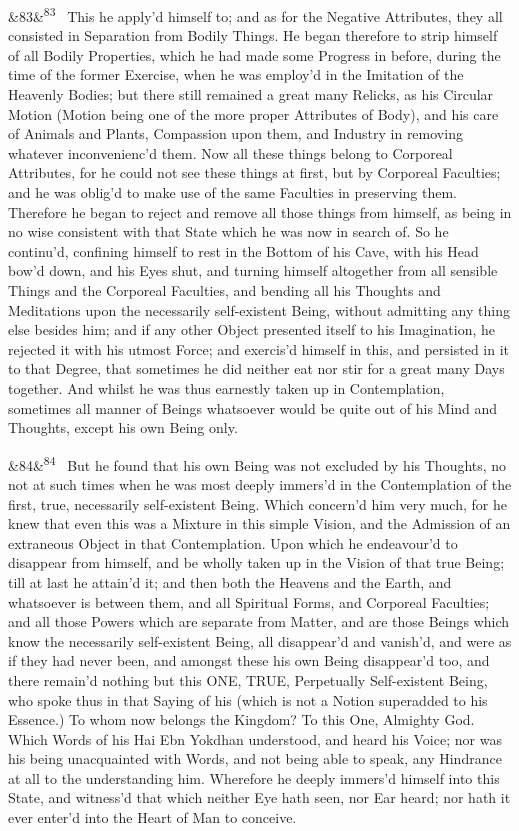 \documentclass[12pt]{article}
\newcommand{\para}[1][]{\par\noindent\ifx&#1&\else\textsuperscript{\footnotesize #1}~\fi}
\begin{document}
\para[83] This he apply'd himself to; and as for the Negative Attributes, they all consisted in Separation from Bodily Things. He began therefore to strip himself of all Bodily Properties, which he had made some Progress in before, during the time of the former Exercise, when he was employ'd in the Imitation of the Heavenly Bodies; but there still remained a great many Relicks, as his Circular Motion (Motion being one of the more proper Attributes of Body), and his care of Animals and Plants, Compassion upon them, and Industry in removing whatever inconvenienc'd them. Now all these things belong to Corporeal Attributes, for he could not see these things at first, but by Corporeal Faculties; and he was oblig'd to make use of the same Faculties in preserving them. Therefore he began to reject and remove all those things from himself, as being in no wise consistent with that State which he was now in search of. So he continu'd, confining himself to rest in the Bottom of his Cave, with his Head bow'd down, and his Eyes shut, and turning himself altogether from all sensible Things and the Corporeal Faculties, and bending all his Thoughts and Meditations upon the necessarily self-existent Being, without admitting any thing else besides him; and if any other Object presented itself to his Imagination, he rejected it with his utmost Force; and exercis'd himself in this, and persisted in it to that Degree, that sometimes he did neither eat nor stir for a great many Days together. And whilst he was thus earnestly taken up in Contemplation, sometimes all manner of Beings whatsoever would be quite out of his Mind and Thoughts, except his own Being only.

\para[84] But he found that his own Being was not excluded by his Thoughts, no not at such times when he was most deeply immers'd in the Contemplation of the first, true, necessarily self-existent Being. Which concern'd him very much, for he knew that even this was a Mixture in this simple Vision, and the Admission of an extraneous Object in that Contemplation. Upon which he endeavour'd to disappear from himself, and be wholly taken up in the Vision of that true Being; till at last he attain'd it; and then both the Heavens and the Earth, and whatsoever is between them, and all Spiritual Forms, and Corporeal Faculties; and all those Powers which are separate from Matter, and are those Beings which know the necessarily self-existent Being, all disappear'd and vanish'd, and were as if they had never been, and amongst these his own Being disappear'd too, and there remain'd nothing but this ONE, TRUE, Perpetually Self-existent Being, who spoke thus in that Saying of his (which is not a Notion superadded to his Essence.) To whom now belongs the Kingdom? To this One, Almighty God. Which Words of his Hai Ebn Yokdhan understood, and heard his Voice; nor was his being unacquainted with Words, and not being able to speak, any Hindrance at all to the understanding him. Wherefore he deeply immers'd himself into this State, and witness'd that which neither Eye hath seen, nor Ear heard; nor hath it ever enter'd into the Heart of Man to conceive.
\end{document}
